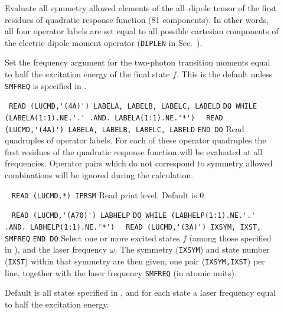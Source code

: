 \begin{description}
\item[] 
Evaluate all symmetry allowed elements of the all--dipole tensor
of the first residues of quadratic response function
(81 components). In other words, all four operator labels 
are set equal to all possible cartesian components of 
the electric dipole moment operator (\verb+DIPLEN+ in Sec.~).
%
\item[] 
Set the frequency argument for the two-photon transition moments
equal to  half the excitation energy of the final state $f$. This is the default unless \verb+SMFREQ+ is specified in .
%
\item[] \verb| |\newline
\verb|READ (LUCMD,'(4A)') LABELA, LABELB, LABELC, LABELD|\newline
\verb|DO WHILE (LABELA(1:1).NE.'.' .AND. LABELA(1:1).NE.'*')|\newline
\verb|  READ (LUCMD,'(4A)') LABELA, LABELB, LABELC, LABELD|\newline
\verb|END DO|\newline
Read quadruples of operator labels.
For each of these operator quadruples the first residues of the quadratic response
function will be evaluated at all frequencies.
Operator pairs which do not correspond to symmetry allowed
combinations will be ignored during the calculation.
%
\item[] \verb| |\newline
\verb|READ (LUCMD,*) IPRSM|\newline
Read print level. Default is 0.
%
\item[] \verb| | \newline
\verb|READ (LUCMD,'(A70)') LABHELP|\newline
\verb|DO WHILE (LABHELP(1:1).NE.'.' .AND. LABHELP(1:1).NE.'*')|\newline
\verb|  READ (LUCMD,'(3A)') IXSYM, IXST, SMFREQ|\newline
\verb|END DO| \newline
Select one or more excited states $f$ (among those specified
in ), and the laser frequency $\omega$.
The symmetry (\verb+IXSYM+) and state number (\verb+IXST+)
within that symmetry are then given,
one pair (\verb|IXSYM,IXST|) per line, together with the
laser frequency \verb+SMFREQ+ (in atomic units).

Default is all states specified in , and for each state 
a laser frequency equal to half the excitation energy.

%
\end{description}
